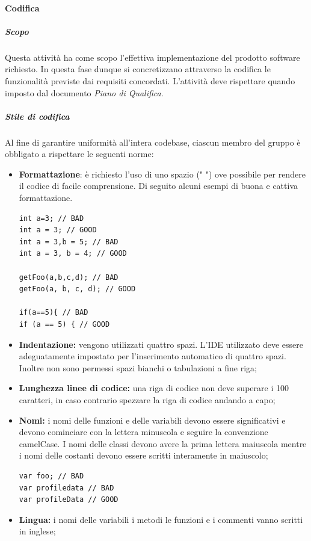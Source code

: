 		\paragraph{Codifica}
			\subparagraph{Scopo} \Spazio
			Questa attività ha come scopo l'effettiva implementazione del prodotto software richiesto. In questa fase dunque si concretizzano attraverso la codifica le funzionalità previste dai requisiti concordati.
			L'attività deve rispettare quando imposto dal documento \textit{Piano di Qualifica}.
			\subparagraph{Stile di codifica} \Spazio
			Al fine di garantire uniformità all'intera codebase, ciascun membro del gruppo è obbligato a rispettare le seguenti norme:
			\begin{itemize}
			\item \textbf{Formattazione}: è richiesto l'uso di uno spazio (" ") ove possibile per rendere il codice di facile comprensione.
			Di seguito alcuni  esempi di buona e cattiva formattazione.
\begin{lstlisting}
int a=3; // BAD
int a = 3; // GOOD
int a = 3,b = 5; // BAD
int a = 3, b = 4; // GOOD

getFoo(a,b,c,d); // BAD
getFoo(a, b, c, d); // GOOD

if(a==5){ // BAD
if (a == 5) { // GOOD
\end{lstlisting}
			
			\item \textbf{Indentazione:} vengono utilizzati quattro spazi. L'IDE utilizzato deve essere adeguatamente impostato per l'inserimento automatico di quattro spazi. Inoltre non sono permessi spazi bianchi o tabulazioni a fine riga;
			
			\item \textbf{Lunghezza linee di codice:} una riga di codice non deve superare i 100 caratteri, in caso contrario spezzare la riga di codice andando a capo;
			
			\item \textbf{Nomi:} i nomi delle funzioni e delle variabili devono essere significativi e devono cominciare con la lettera minuscola e seguire la convenzione camelCase. I nomi delle classi devono avere la prima lettera maiuscola mentre i nomi delle costanti devono essere scritti interamente in maiuscolo;
\begin{lstlisting}
var foo; // BAD
var profiledata // BAD
var profileData // GOOD
\end{lstlisting}
			
			\item \textbf{Lingua:} i nomi delle variabili i metodi le funzioni e i commenti vanno scritti in inglese;
			

\end{itemize}
